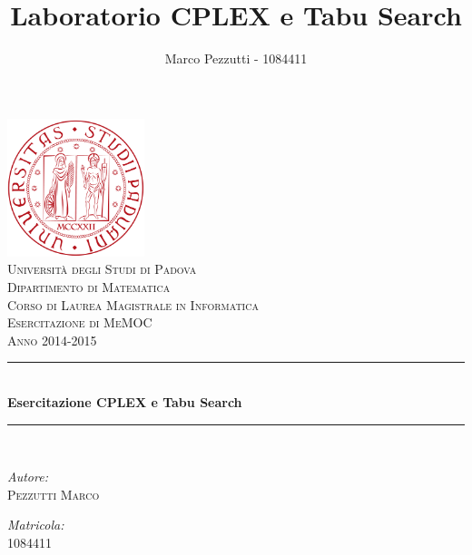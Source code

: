 \documentclass[11pt,a4paper,final]{article}
\author{Marco Pezzutti - 1084411}
\title{Laboratorio CPLEX e Tabu Search}
\date{}
\begin{document}
\begin{titlepage}
\begin{center}
\includegraphics[width=40mm]{immagini/Logo_Padova.png}\\[1cm]
\textcolor{redUni}{\textsc{\LARGE Università degli Studi di Padova}}\\[0.5cm]
\textcolor{redUni}{\textsc{\Large Dipartimento di Matematica}}\\[0.5cm]
\textcolor{redUni}{\textsc{\Large Corso di Laurea Magistrale in Informatica}}\\[2cm]
\textsc{\Large Esercitazione di MeMOC}\\[0.5cm]
\textsc{\large Anno 2014-2015} \\[1cm]
\rule{\linewidth}{0.3mm}\\[0.5cm]
{\huge \bfseries Esercitazione CPLEX e Tabu Search}\\[0.3cm]
\rule{\linewidth}{0.3mm}\\[1cm]
\begin{minipage}{0.4\textwidth}
	\begin{flushleft}
	\emph{Autore:}\\
	\textsc{\large Pezzutti Marco}\\
	\end{flushleft}
\end{minipage}
\begin{minipage}{0.4\textwidth}
	\begin{flushright}
	\emph{Matricola:}\\
	\textsc{\large 1084411}\\
	\end{flushright}
\end{minipage}
\end{center}
\end{titlepage}

\tableofcontents
\listoffigures
\listoftables
\newpage







\appendix

\end{document}
